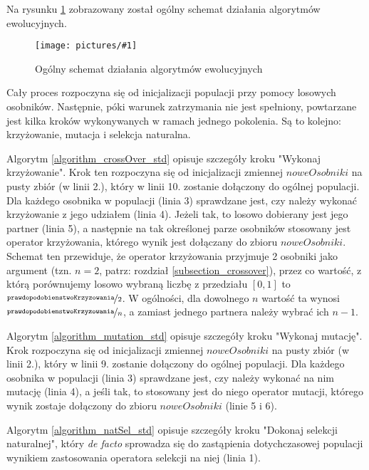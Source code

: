 \documentclass[twoside]{iisthesis}
\newcommand{\defacto}{\emph{de facto }}
\newcommand{\param}{\mathtt}
\newcommand{\img}[1]{\texttt{[image: pictures/\#1]}}
\begin{document}
\newpage

Na rysunku \ref{figure_ea_general} zobrazowany został ogólny schemat działania algorytmów ewolucyjnych. 

\begin{figure}
	\caption{Ogólny schemat działania algorytmów ewolucyjnych \label{figure_ea_general}}
	\img{ea_general.png}
\end{figure}

Cały proces rozpoczyna się od inicjalizacji populacji przy pomocy losowych osobników. Następnie, póki warunek zatrzymania nie jest spełniony, powtarzane jest kilka kroków wykonywanych w ramach jednego pokolenia. Są to kolejno: krzyżowanie, mutacja i selekcja naturalna.

Algorytm \ref{algorithm_crossOver_std} opisuje szczegóły kroku "Wykonaj krzyżowanie". Krok ten rozpoczyna się od inicjalizacji zmiennej $noweOsobniki$ na pusty zbiór (w linii 2.), który w linii 10. zostanie dołączony do ogólnej populacji. Dla każdego osobnika w populacji (linia 3) sprawdzane jest, czy należy wykonać krzyżowanie z jego udziałem (linia 4). Jeżeli tak, to losowo dobierany jest jego partner (linia 5), a następnie na tak określonej parze osobników stosowany jest operator krzyżowania, którego wynik jest dołączany do zbioru $noweOsobniki$. Schemat ten przewiduje, że operator krzyżowania przyjmuje 2 osobniki jako argument (tzn. $n = 2$, patrz: rozdział \ref{subsection_crossover}), przez co wartość, z którą porównujemy losowo wybraną liczbę z przedziału $[0, 1]$ to $\nicefrac{\param{prawdopodobienstwoKrzyzowania}}{2}$. W ogólności, dla dowolnego $n$ wartość ta wynosi $\nicefrac{\param{prawdopodobienstwoKrzyzowania}}{n}$, a zamiast jednego partnera należy wybrać ich $n-1$.

Algorytm \ref{algorithm_mutation_std} opisuje szczegóły kroku "Wykonaj mutację". Krok rozpoczyna się od inicjalizacji zmiennej $noweOsobniki$ na pusty zbiór (w linii 2.), który w linii 9. zostanie dołączony do ogólnej populacji. Dla każdego osobnika w populacji (linia 3) sprawdzane jest, czy należy wykonać na nim mutację (linia 4), a jeśli tak, to stosowany jest do niego operator mutacji, którego wynik zostaje dołączony do zbioru $noweOsobniki$ (linie 5 i 6).

Algorytm \ref{algorithm_natSel_std} opisuje szczegóły kroku "Dokonaj selekcji naturalnej", który \defacto sprowadza się do zastąpienia dotychczasowej populacji wynikiem zastosowania operatora selekcji na niej (linia 1).
\end{document}
